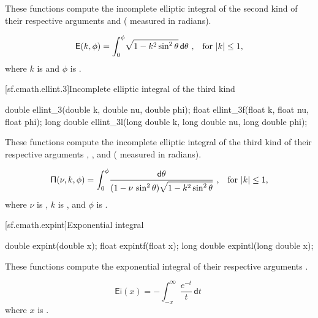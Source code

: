 \begin{itemdescr}
\pnum
\effects
These functions compute
the incomplete elliptic integral of the second kind
of their respective arguments
 and  ( measured in radians).

\pnum
\returns
\[ \mathsf{E}(k, \phi) = \int_0^\phi \! \sqrt{1 - k^2 \sin^2 \theta} \, \mathsf{d}\theta
   \text{ ,\quad for $|k| \le 1$,} \]
where
$k$ is  and
$\phi$ is .
\end{itemdescr}

[sf.cmath.ellint.3]{Incomplete elliptic integral of the third kind}%
%
%
%
%
%
\begin{itemdecl}
double       ellint_3(double k, double nu, double phi);
float        ellint_3f(float k, float nu, float phi);
long double  ellint_3l(long double k, long double nu, long double phi);
\end{itemdecl}

\begin{itemdescr}

\pnum\effects
These functions compute
the incomplete elliptic integral of the third kind
of their respective arguments
, , and  ( measured in radians).

\pnum
\returns
\[ \mathsf{\Pi}(\nu, k, \phi) = \int_0^\phi \!
   \frac{ \mathsf{d}\theta }{ (1 - \nu \, \sin^2 \theta) \sqrt{1 - k^2 \sin^2 \theta} } \text{ ,\quad for $|k| \le 1$,} \]
where
$\nu$ is ,
$k$ is , and
$\phi$ is .
\end{itemdescr}

[sf.cmath.expint]{Exponential integral}%
%
%
%
%
%
\begin{itemdecl}
double       expint(double x);
float        expintf(float x);
long double  expintl(long double x);
\end{itemdecl}

\begin{itemdescr}

\pnum\effects
These functions compute the exponential integral
of their respective arguments
.

\pnum\returns
\[%
  \mathsf{Ei}(x) =
  - \int_{-x}^\infty \frac{e^{-t}}
                          {t     } \, \mathsf{d}t
\;
\]
where
$x$ is .

\end{itemdescr}

